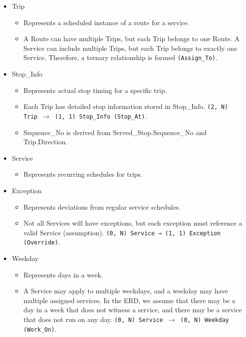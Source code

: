 \documentclass[a4paper, 12pt]{article}
\begin{document}
\begin{itemize}
    \item Trip
    \begin{itemize}
        \item Represents a scheduled instance of a route for a service.
        \item A Route can have multiple Trips, but each Trip belongs to one Route. A Service can include multiple Trips, but each Trip belongs to exactly one Service. Therefore, a ternary relationship is formed \texttt{(Assign\_To)}.
    \end{itemize}

    \item Stop\_Info
    \begin{itemize}
        \item Represents actual stop timing for a specific trip.
        \item Each Trip has detailed stop information stored in Stop\_Info. \texttt{(2, N) Trip $\to$ (1, 1) Stop\_Info (Stop\_At)}.
        \item Sequence\_No is derived from Served\_Stop.Sequence\_No and Trip.Direction.
    \end{itemize}

    \item Service
    \begin{itemize}
        \item Represents recurring schedules for trips.

    \end{itemize}

    \item Exception
    \begin{itemize}
        \item Represents deviations from regular service schedules.
        \item Not all Services will have exceptions, but each exception must reference a valid Service (assumption). \texttt{(0, N) Service → (1, 1) Exception (Override)}.
    \end{itemize}

    \item Weekday
    \begin{itemize}
        \item Represents days in a week.
        \item A Service may apply to multiple weekdays, and a weekday may have multiple assigned services. In the ERD, we assume that there may be a day in a week that does not witness a service, and there may be a service that does not run on any day. \texttt{(0, N) Service $\to$ (0, N) Weekday (Work\_On)}.
    \end{itemize}

\end{itemize}
\end{document}
